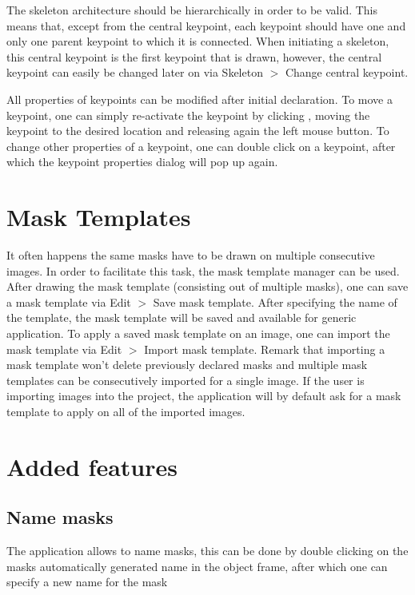 \documentclass[a4paper, 11pt]{article}
\begin{document}
The skeleton architecture should be hierarchically in order to be valid. This means that, except from the central keypoint, each keypoint should have one and only one parent keypoint to which it is connected. When initiating a skeleton, this central keypoint is the first keypoint that is drawn, however, the central keypoint can easily be changed later on via Skeleton $>$ Change central keypoint.

All properties of keypoints can be modified after initial declaration. To move a keypoint, one can simply re-activate the keypoint by clicking , moving the keypoint to the desired location and releasing again the left mouse button. To change other properties of a keypoint, one can double click on a keypoint, after which the keypoint properties dialog will pop up again.

\section{Mask Templates}
It often happens the same masks have to be drawn on multiple consecutive images. In order to facilitate this task, the mask template manager can be used. After drawing the mask template (consisting out of multiple masks), one can save a mask template via Edit $>$ Save mask template. After specifying the name of the template, the mask template will be saved and available for generic application. To apply a saved mask template on an image, one can import the mask template via Edit $>$ Import mask template. Remark that importing a mask template won't delete previously declared masks and multiple mask templates can be consecutively imported for a single image. If the user is importing images into the project, the application will by default ask for a mask template to apply on all of the imported images.

\section{Added features}

\subsection{Name masks}
The application allows to name masks, this can be done by double clicking on the masks automatically generated name in the object frame, after which one can specify a new name for the mask
\end{document}
